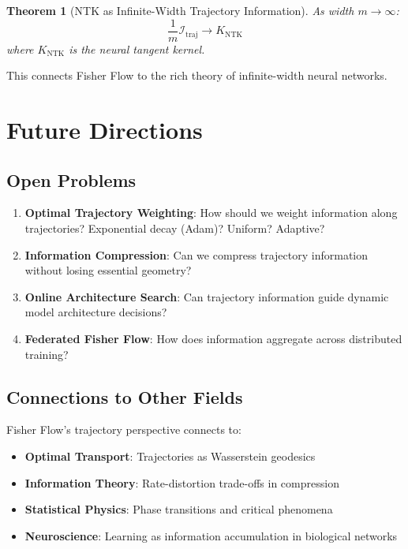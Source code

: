 \documentclass[11pt]{article}
\newtheorem{theorem}{Theorem}
\begin{document}
\begin{theorem}[NTK as Infinite-Width Trajectory Information]
As width $m \to \infty$:
\begin{equation}
\frac{1}{m}\mathcal{I}_{\text{traj}} \to K_{\text{NTK}}
\end{equation}
where $K_{\text{NTK}}$ is the neural tangent kernel.
\end{theorem}

This connects Fisher Flow to the rich theory of infinite-width neural networks.

\section{Future Directions}

\subsection{Open Problems}

\begin{enumerate}
\item \textbf{Optimal Trajectory Weighting}: How should we weight information along trajectories? Exponential decay (Adam)? Uniform? Adaptive?

\item \textbf{Information Compression}: Can we compress trajectory information without losing essential geometry?

\item \textbf{Online Architecture Search}: Can trajectory information guide dynamic model architecture decisions?

\item \textbf{Federated Fisher Flow}: How does information aggregate across distributed training?
\end{enumerate}

\subsection{Connections to Other Fields}

Fisher Flow's trajectory perspective connects to:
\begin{itemize}
\item \textbf{Optimal Transport}: Trajectories as Wasserstein geodesics
\item \textbf{Information Theory}: Rate-distortion trade-offs in compression
\item \textbf{Statistical Physics}: Phase transitions and critical phenomena
\item \textbf{Neuroscience}: Learning as information accumulation in biological networks
\end{itemize}
\end{document}
